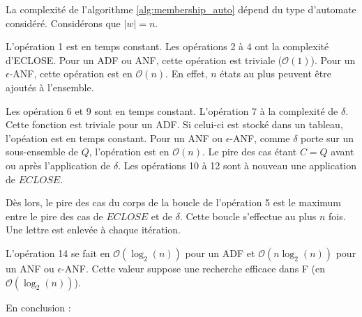 \begin{complexity}

La complexité de l'algorithme \ref{alg:membership_auto} dépend du type d'automate considéré. Considérons que $|w|=n$.

L'opération 1 est en temps constant. Les opérations 2 à 4 ont la complexité d'ECLOSE. Pour un ADF ou ANF, cette opération est triviale ($\mathcal{O}(1)$). Pour un $\epsilon$-ANF, cette opération est en $\mathcal{O}(n)$. En effet, $n$ états au plus peuvent être ajoutés à l'ensemble.

Les opération 6 et 9 sont en temps constant. L'opération 7 à la complexité de $\delta$. Cette fonction est triviale pour un ADF. Si celui-ci est stocké dans un tableau, l'opéation est en temps constant. Pour un ANF ou $\epsilon$-ANF, comme $\delta$ porte sur un sous-ensemble de $Q$, l'opération est en $\mathcal{O}(n)$. Le pire des cas étant $C=Q$ avant ou après l'application de $\delta$. Les opérations 10 à 12 sont à nouveau une application de $ECLOSE$.

Dès lors, le pire des cas du corps de la boucle de l'opération 5 est le maximum entre le pire des cas de $ECLOSE$ et de $\delta$. Cette boucle s'effectue au plus $n$ fois. Une lettre est enlevée à chaque itération.

L'opération 14 se fait en $\mathcal{O}(\log_2(n))$ pour un ADF et $\mathcal{O}(n\log_2(n))$ pour un ANF ou $\epsilon$-ANF. Cette valeur suppose une recherche efficace dans F (en $\mathcal{O}(\log_2(n))$).

En conclusion :
\begin{table}[H]
  \centering
\end{table}



\end{complexity}

